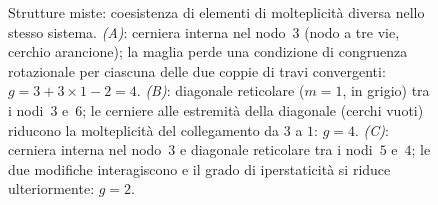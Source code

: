 \begin{figure}[htbp]
\begin{tikzpicture}
	\end{tikzpicture}
	\caption{Strutture miste: coesistenza di elementi
		di molteplicità diversa nello stesso sistema.
		\emph{(A)}: cerniera interna nel nodo~$3$
		(nodo a tre vie, cerchio arancione);
		la maglia perde una condizione di congruenza
		rotazionale per ciascuna delle due coppie di
		travi convergenti: $g = 3 + 3\times1 - 2 = 4$.
		\emph{(B)}: diagonale reticolare ($m=1$,
		in grigio) tra i nodi~$3$ e~$6$; le cerniere
		alle estremità della diagonale (cerchi vuoti)
		riducono la molteplicità del collegamento
		da $3$ a $1$: $g = 4$.
		\emph{(C)}: cerniera interna nel nodo~$3$
		e diagonale reticolare tra i nodi~$5$ e~$4$;
		le due modifiche interagiscono e il grado
		di iperstaticità si riduce ulteriormente:
		$g = 2$.}
	\label{fig:strutture_miste}
\end{figure}
